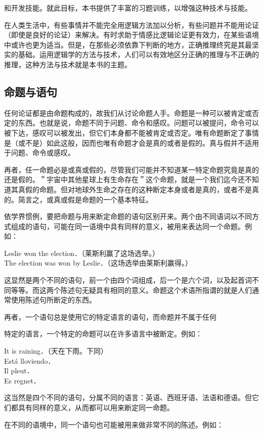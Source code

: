 和开发技能。就此目标，本书提供了丰富的习题训练，以增强这种技术与技能。

在人类生活中，有些事情并不能完全用逻辑方法加以分析，有些问题并不能用论证（即使是良好的论证）来解决。有时求助于情感比逻辑论证更有效力，在某些语境中或许也更为适当。但是，在那些必须依靠下判断的地方，正确推理终究是其最坚实的基础。运用逻辑学的方法与技术，人们可以有效地区分正确的推理与不正确的推理，这种方法与技术就是本书的主题。

\subsection{命题与语句}
任何论证都是由命题构成的，故我们从讨论命题人手。命题是一种可以被肯定或否定的东西。也就是说，命题不同于问题、命令和感叹。问题可以被提问，命令可以被下达，感叹可以被发出，但它们本身都不能被肯定或否定。唯有命题断定了事情是（或不是）如此这般，因而也唯有命题才会是真的或者是假的。真与假并不适用于问题、命令或感叹。

再者，任一命题必是或真或假的，尽管我们可能并不知道某一特定命题究竟是真的还是假的。＂宇宙中其他星球上有生命存在＂这个命题，就是一个我们迄今还不知道其真假的命题。但对地球外生命之存在的这种断定本身或者是真的，或者不是真的。简言之，或真或假是命题的一个基本特征。

依学界惯例，要把命题与用来断定命题的语句区别开来。两个由不同语词以不同方式组成的语句，可能在同一语境中具有同样的意义，被用来表达同一个命题。例如：

Leslie won the election．（莱斯利赢了这场选举。）\\
The election was won by Leslie．（这场选举由莱斯利赢得。）

这显然是两个不同的语句，前一个由四个词组成，后一个是六个词，以及起首词不同等等。而这两个陈述句无疑具有相同的意义。命题这个术语所指谓的就是人们通常使用陈述句所断定的东西。

再者，一个语句总是使用它的特定语言的语句，而命题并不属于任何

特定的语言，一个特定的命题可以在许多语言中被断定。例如：

It is raining．（天在下雨。下同）\\
Está lloviendo．\\
Il pleut．\\
Es regnet．

这当然是四个不同的语句，分属不同的语言：英语、西班牙语、法语和德语。但它们都具有同样的意义，从而都可以用来断定同一命题。

在不同的语境中，同一个语句也可能被用来做非常不同的陈述。例如：

